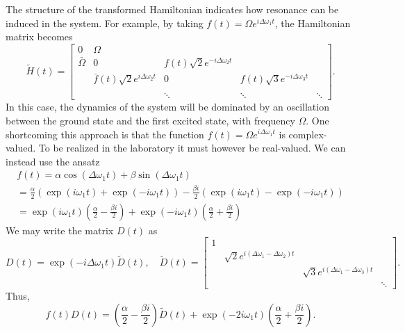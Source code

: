 \documentclass[11pt]{article}
\begin{document}
The structure of the transformed Hamiltonian indicates how resonance can be induced in the
system. For example, by taking $f(t)=\Omega e^{i\Delta \omega_1 t}$, the Hamiltonian matrix
becomes
\[
\tilde{H}(t) = \begin{bmatrix}
0 & \Omega & & &\\
\bar{\Omega} & 0 & f(t) \sqrt{2} e^{-i\Delta \omega_2 t}& &\\
& \bar{f}(t) \sqrt{2} e^{i\Delta \omega_2 t} & 0 & f(t) \sqrt{3} e^{-i\Delta \omega_3 t}
&\\
\\
& & \ddots & \ddots & \ddots
\end{bmatrix}.
\]
In this case, the dynamics of the system will be dominated by an oscillation between the ground
state and the first excited state, with frequency $\Omega$. One shortcoming this approach is that
the function $f(t)=\Omega e^{i\Delta \omega_1 t}$ is complex-valued. To be realized in the laboratory
it must however be real-valued. We can instead use the ansatz
\begin{multline*}
  f(t) = \alpha \cos(\Delta \omega_1 t) + \beta \sin(\Delta \omega_1 t)\\
  = \frac{\alpha}{2} \left( \exp(i \omega_1 t) + \exp(-i \omega_1 t)\right) - \frac{\beta i}{2}
  \left( \exp(i \omega_1 t) - \exp(-i \omega_1 t)\right)\\
  = \exp(i \omega_1 t) \left( \frac{\alpha}{2}  - \frac{\beta i}{2} \right)  +
  \exp(-i \omega_1 t)\left( \frac{\alpha}{2} + \frac{\beta i}{2} \right)
\end{multline*}
We may write the matrix $D(t)$ as
\[
D(t) = \exp(-i\Delta\omega_1 t) \widetilde{D}(t),\quad
%
\widetilde{D}(t) = \begin{bmatrix}
 1 & & &\\
  & \sqrt{2} e^{i(\Delta\omega_1- \Delta\omega_2) t}& &\\
&  & \sqrt{3} e^{i(\Delta\omega_1 - \Delta\omega_3) t}  &\\
&  &   & \ddots
\end{bmatrix}.
\]
Thus,
\[
f(t) D(t) = \left( \frac{\alpha}{2}  - \frac{\beta i}{2} \right) \widetilde{D}(t) + \exp(-2i \omega_1 t)\left( \frac{\alpha}{2} + \frac{\beta i}{2} \right).
\]
\end{document}
